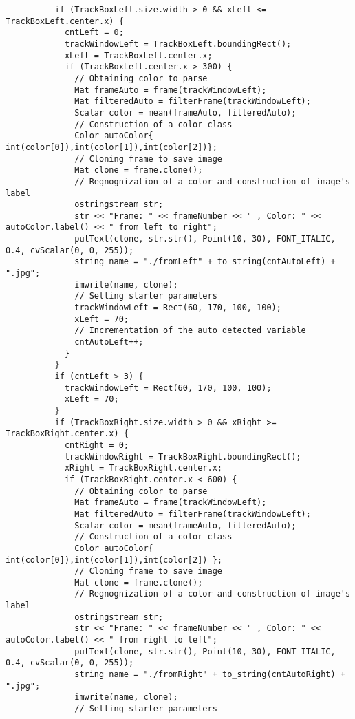 \documentclass[8pt,a4paper]{article}
\begin{document}
\begin{multicols}{5}
\begin{verbatim}
          if (TrackBoxLeft.size.width > 0 && xLeft <= TrackBoxLeft.center.x) {
            cntLeft = 0;
            trackWindowLeft = TrackBoxLeft.boundingRect();
            xLeft = TrackBoxLeft.center.x;
            if (TrackBoxLeft.center.x > 300) {
              // Obtaining color to parse
              Mat frameAuto = frame(trackWindowLeft);
              Mat filteredAuto = filterFrame(trackWindowLeft);
              Scalar color = mean(frameAuto, filteredAuto);
              // Construction of a color class
              Color autoColor{ int(color[0]),int(color[1]),int(color[2])};
              // Cloning frame to save image
              Mat clone = frame.clone();
              // Regnognization of a color and construction of image's label
              ostringstream str;
              str << "Frame: " << frameNumber << " , Color: " << autoColor.label() << " from left to right";
              putText(clone, str.str(), Point(10, 30), FONT_ITALIC, 0.4, cvScalar(0, 0, 255));
              string name = "./fromLeft" + to_string(cntAutoLeft) + ".jpg";
              imwrite(name, clone);
              // Setting starter parameters
              trackWindowLeft = Rect(60, 170, 100, 100);
              xLeft = 70;
              // Incrementation of the auto detected variable
              cntAutoLeft++;
            }
          }
          if (cntLeft > 3) {
            trackWindowLeft = Rect(60, 170, 100, 100);
            xLeft = 70;
          }
          if (TrackBoxRight.size.width > 0 && xRight >= TrackBoxRight.center.x) {
            cntRight = 0;
            trackWindowRight = TrackBoxRight.boundingRect();
            xRight = TrackBoxRight.center.x;
            if (TrackBoxRight.center.x < 600) {
              // Obtaining color to parse
              Mat frameAuto = frame(trackWindowLeft);
              Mat filteredAuto = filterFrame(trackWindowLeft);
              Scalar color = mean(frameAuto, filteredAuto);
              // Construction of a color class
              Color autoColor{ int(color[0]),int(color[1]),int(color[2]) };
              // Cloning frame to save image
              Mat clone = frame.clone();
              // Regnognization of a color and construction of image's label
              ostringstream str;
              str << "Frame: " << frameNumber << " , Color: " << autoColor.label() << " from right to left";
              putText(clone, str.str(), Point(10, 30), FONT_ITALIC, 0.4, cvScalar(0, 0, 255));
              string name = "./fromRight" + to_string(cntAutoRight) + ".jpg";
              imwrite(name, clone);
              // Setting starter parameters

\end{verbatim}
\end{multicols}
\end{document}
